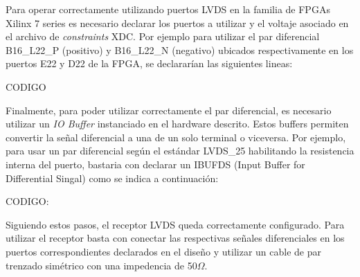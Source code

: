 	Para operar correctamente utilizando puertos LVDS en la familia de FPGAs Xilinx 7 series es necesario declarar los puertos a utilizar y el voltaje asociado en el archivo de \textit{constraints} XDC. Por ejemplo para utilizar el par diferencial B16\_L22\_P (positivo) y B16\_L22\_N (negativo) ubicados respectivamente en los puertos E22 y D22 de la FPGA, se declararían las siguientes lineas:
	
	CODIGO


	Finalmente, para poder utilizar correctamente el par diferencial, es necesario utilizar un \textit{IO Buffer} instanciado en el hardware descrito. Estos buffers permiten convertir la señal diferencial a una de un solo terminal o viceversa. Por ejemplo, para usar un par diferencial según el estándar LVDS\_25 habilitando la resistencia interna del puerto, bastaria con declarar un IBUFDS (Input Buffer for Differential Singal) como se indica a continuación:
	
	CODIGO:



Siguiendo estos pasos, el receptor LVDS queda correctamente configurado. Para utilizar el receptor basta con conectar las respectivas señales diferenciales en los puertos correspondientes declarados en el diseño y utilizar un cable de par trenzado simétrico con una impedencia de 50$\Omega$.